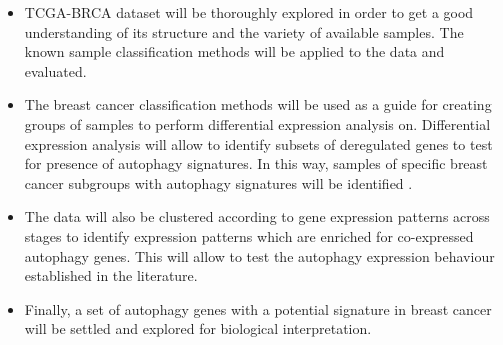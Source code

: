 \begin{itemize}
    
\item TCGA-BRCA dataset will be thoroughly explored in order to get a good understanding of its structure and the variety of available samples. The known sample classification methods will be applied to the data and evaluated.
\item The breast cancer classification methods will be used as a guide for creating groups of samples to perform differential expression analysis on. Differential expression analysis will allow to identify subsets of deregulated genes to test for presence of autophagy signatures. In this way, samples of specific breast cancer subgroups with autophagy signatures will be identified .
\item The data will also be clustered according to gene expression patterns across stages to identify expression patterns which are enriched for co-expressed autophagy genes. This will allow to test the autophagy expression behaviour established in the literature.
\item Finally, a set of autophagy genes with a potential signature in breast cancer will be settled and explored for biological interpretation. 

\end{itemize}
